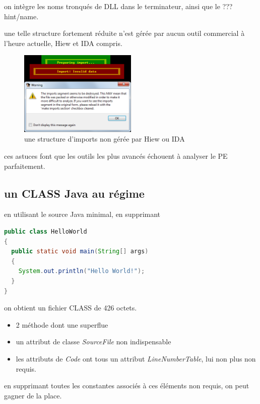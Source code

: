 \begin{itemize}
on intègre les noms tronqués de DLL dans le terminateur, ainsi que le ??? hint/name.

une telle structure fortement réduite n'est gérée par aucun outil commercial à l'heure actuelle, Hiew et IDA compris.

\begin{figure}[ht]
  \centering
  \includegraphics[width=0.5\textwidth]{albertini/img/imports_error}
  \caption{une structure d'imports non gérée par Hiew ou IDA}
  \label{fig:albertini:imports_error}
\end{figure}

ces astuces font que les outils les plus avancés échouent à analyser le PE parfaitement.

\end{itemize}

\subsection{un CLASS Java au régime}
en utilisant le source Java minimal, en supprimant

\begin{lstlisting}[language={java},caption={un Hello World minimal en Java},label={lst:albertini:hwjava}]
 public class HelloWorld
{
  public static void main(String[] args)
  {
    System.out.println("Hello World!");
  }
}
\end{lstlisting}

on obtient un fichier CLASS de 426 octets.
\begin{itemize}
\item 2 méthode dont une superflue
\item un attribut de classe {\em SourceFile} non indispensable
\item les attributs de {\em Code} ont tous un attribut {\em LineNumberTable}, lui non plus non requis.
\end{itemize}

en supprimant toutes les constantes associés à ces éléments non requis, on peut gagner de la place.


